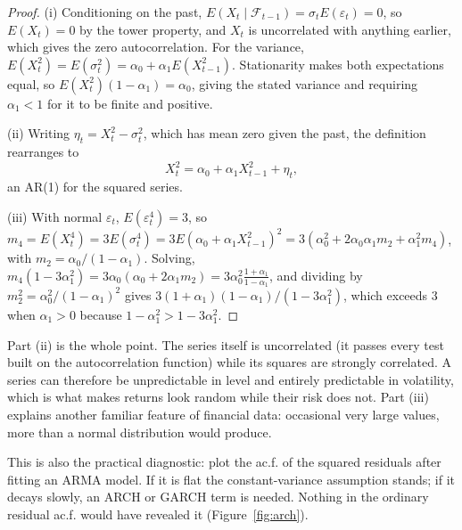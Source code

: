 \documentclass[11pt,a4paper]{article}
\theoremstyle{definition}
\begin{document}
\begin{proof}
(i) Conditioning on the past, $E(X_t \mid \mathcal{F}_{t-1}) = \sigma_tE(\varepsilon_t) = 0$, so $E(X_t) = 0$ by the tower property, and $X_t$ is uncorrelated with
anything earlier, which gives the zero autocorrelation. For the variance, $E(X_t^2) = E(\sigma_t^2) = \alpha_0 + \alpha_1E(X_{t-1}^2)$. Stationarity
makes both expectations equal, so $E(X_t^2)(1 - \alpha_1) = \alpha_0$, giving the stated variance and requiring $\alpha_1 < 1$ for it to be finite and
positive.

(ii) Writing $\eta_t = X_t^2 - \sigma_t^2$, which has mean zero given the past, the definition rearranges to
\[
X_t^2 = \alpha_0 + \alpha_1X_{t-1}^2 + \eta_t ,
\]
an AR(1) for the squared series.

(iii) With normal $\varepsilon_t$, $E(\varepsilon_t^4) = 3$, so $m_4 = E(X_t^4) = 3E(\sigma_t^4) = 3E(\alpha_0 + \alpha_1X_{t-1}^2)^2 = 3(\alpha_0^2 + 2\alpha_0\alpha_1m_2 + \alpha_1^2m_4)$, with
$m_2 = \alpha_0/(1 - \alpha_1)$. Solving, $m_4(1 - 3\alpha_1^2) = 3\alpha_0(\alpha_0 + 2\alpha_1m_2) = 3\alpha_0^2\frac{1 + \alpha_1}{1 - \alpha_1}$, and dividing by $m_2^2 = \alpha_0^2/(1 - \alpha_1)^2$ gives
$3(1 + \alpha_1)(1 - \alpha_1)/(1 - 3\alpha_1^2)$, which exceeds $3$ when $\alpha_1 > 0$ because $1 - \alpha_1^2 > 1 - 3\alpha_1^2$.
\end{proof}

Part (ii) is the whole point. The series itself is uncorrelated (it passes every test built on the
autocorrelation function) while its squares are strongly correlated. A series can therefore be unpredictable in
level and entirely predictable in volatility, which is what makes returns look random while their risk does
not. Part (iii) explains another familiar feature of financial data: occasional very large values, more than a
normal distribution would produce.

This is also the practical diagnostic: plot the ac.f. of the squared residuals after fitting an ARMA model. If it is
flat the constant-variance assumption stands; if it decays slowly, an ARCH or GARCH term is needed. Nothing in
the ordinary residual ac.f. would have revealed it (Figure~\ref{fig:arch}).
\end{document}
